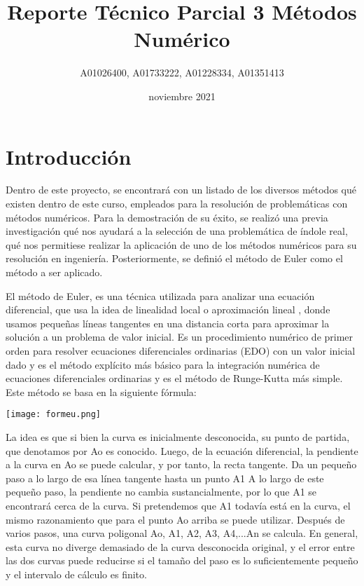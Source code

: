\documentclass{article}
\title{Reporte Técnico Parcial 3 Métodos Numérico}
\author{A01026400, A01733222, A01228334, A01351413 }
\date{noviembre 2021}
\begin{document}
\maketitle

\section{Introducción}
\item Dentro de este proyecto, se encontrará con un listado de los diversos métodos qué existen dentro de este curso, empleados para la resolución de problemáticas con métodos numéricos. Para la demostración de su éxito, se realizó una previa investigación qué nos ayudará a la selección de una problemática de índole real, qué nos permitiese realizar la aplicación de uno de los métodos  numéricos para su resolución en ingeniería. Posteriormente, se definió el método de Euler como el método a ser aplicado. 

El método de Euler, es una técnica utilizada para analizar una ecuación diferencial, que usa la idea de linealidad local o aproximación lineal , donde usamos pequeñas líneas tangentes en una distancia corta para aproximar la solución a un problema de valor inicial. Es un procedimiento numérico de primer orden para resolver ecuaciones diferenciales ordinarias (EDO) con un valor inicial dado y es el método explícito más básico para la integración numérica de ecuaciones diferenciales ordinarias y es el método de Runge-Kutta más simple. 
Este método se basa en la siguiente fórmula:

 \texttt{[image: formeu.png]}
    \label{fig:my_label}
    
    
\item La idea es que si bien la curva es inicialmente desconocida, su punto de partida, que denotamos por  Ao es conocido. Luego, de la ecuación diferencial, la pendiente a la curva en Ao se puede calcular, y por tanto, la recta tangente. Da un pequeño paso a lo largo de esa línea tangente hasta un punto A1
 A lo largo de este pequeño paso, la pendiente no cambia sustancialmente, por lo que A1 se encontrará cerca de la curva. Si pretendemos que A1 todavía está en la curva, el mismo razonamiento que para el punto Ao arriba se puede utilizar. Después de varios pasos, una curva poligonal Ao, A1, A2, A3, A4,...An  se calcula. En general, esta curva no diverge demasiado de la curva desconocida original, y el error entre las dos curvas puede reducirse si el tamaño del paso es lo suficientemente pequeño y el intervalo de cálculo es finito.
 
\end{document}
